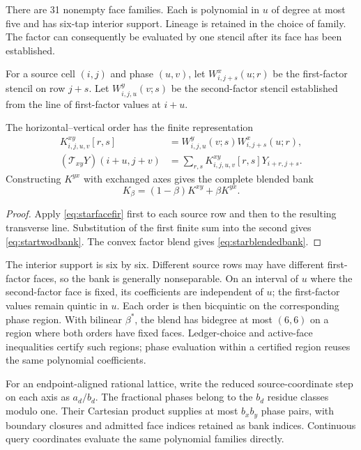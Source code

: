 There are 31 nonempty face families. Each is polynomial in $u$ of degree at
most five and has six-tap interior support. Lineage is retained in the choice
of family. The factor can consequently be evaluated by one stencil after
its face has been established.

For a source cell $(i,j)$ and phase $(u,v)$, let
$W^x_{i,j+s}(u;r)$ be the first-factor stencil on row $j+s$.
Let $W^y_{i,j,u}(v;s)$ be the second-factor stencil established from the line
of first-factor values at $i+u$.

\begin{theorem}
The horizontal--vertical order has the finite representation
\begin{align}
 K^{xy}_{i,j,u,v}[r,s]
 &=W^y_{i,j,u}(v;s)W^x_{i,j+s}(u;r),\nonumber\\
 (\mathcal T_{xy}Y)(i+u,j+v)
 &=\sum_{r,s}K^{xy}_{i,j,u,v}[r,s]Y_{i+r,j+s}.
 \label{eq:startwodbank}
\end{align}
Constructing $K^{yx}$ with exchanged axes gives the complete blended bank
\begin{equation}
 K_\beta=(1-\beta)K^{xy}+\beta K^{yx}.
 \label{eq:starblendedbank}
\end{equation}
\end{theorem}
\begin{proof}
Apply \eqref{eq:starfacefir} first to each source row and then to the resulting
transverse line. Substitution of the first finite sum into the second gives
\eqref{eq:startwodbank}. The convex factor blend gives
\eqref{eq:starblendedbank}.
\end{proof}

The interior support is six by six. Different source rows may have different
first-factor faces, so the bank is generally nonseparable. On an interval of
$u$ where the second-factor face is fixed, its coefficients are independent
of $u$; the first-factor values remain quintic in $u$. Each order is then
bicquintic on the corresponding phase region. With bilinear $\beta^*$, the
blend has bidegree at most $(6,6)$ on a region where both orders have fixed
faces. Ledger-choice and active-face inequalities certify such regions; phase evaluation within
a certified region reuses the same polynomial coefficients.

For an endpoint-aligned rational lattice, write the reduced source-coordinate
step on each axis as $a_d/b_d$. The fractional phases belong to the $b_d$
residue classes modulo one. Their Cartesian product supplies at most
$b_xb_y$ phase pairs, with boundary closures and admitted face indices retained
as bank indices. Continuous query coordinates evaluate the same polynomial
families directly.


